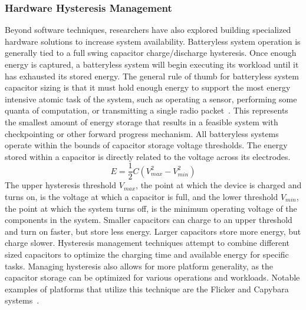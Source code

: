 \subsubsection{Hardware Hysteresis Management}
\label{sec:background:hhm}
Beyond software techniques, researchers have also explored building specialized hardware solutions to increase system availability.
Batteryless system operation is generally tied to a full swing capacitor charge/discharge hysteresis. Once enough energy is captured, a batteryless system will begin executing its workload until it has exhausted its stored energy.
The general rule of thumb for batteryless system capacitor sizing is that it must hold enough energy to support the most energy intensive atomic task of the system, such as operating a sensor, performing some quanta of computation, or transmitting a single radio packet~\cite{nardello2019camaroptera,colinReconfigurable18, shukla2019skinnypower, hesterFlicker17}.
This represents the smallest amount of energy storage that results in a feasible system with checkpointing or other forward progress mechanism.
All batteryless systems operate within the bounds of capacitor storage voltage thresholds.
The energy stored within a capacitor is directly related to the voltage across its electrodes.
\begin{equation}
\label{eq:cap_energy}
    E = \frac{1}{2}C(V_{max}^2 - V_{min}^2)
\end{equation}
The upper hysteresis threshold $V_{max}$, the point at which the device is charged and turns on, is the voltage at which a capacitor is full, and the lower threshold $V_{min}$, the point at which the system turns off, is the minimum
operating voltage of the components in the system.
Smaller capacitors can charge to an upper
threshold and turn on faster, but store less energy.  Larger capacitors store more energy, but charge slower.
Hysteresis management
techniques attempt to combine different sized capacitors to
optimize the charging time and available energy for specific tasks.
Managing hysteresis also allows for more platform generality, as the capacitor storage can be optimized for various operations and workloads.
Notable examples of platforms that utilize this technique are the Flicker and Capybara systems~\cite{hesterFlicker17, colinReconfigurable18}.

